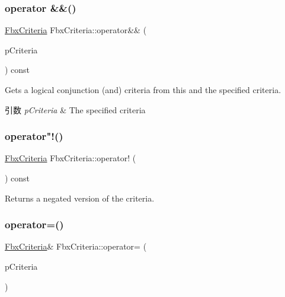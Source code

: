 \subsubsection{\texorpdfstring{operator \&\&()}{operator \&\&()}}
{\footnotesize\ttfamily \hyperlink{class_fbx_criteria}{Fbx\+Criteria} Fbx\+Criteria\+::operator\&\& (\begin{DoxyParamCaption}\item[{const \hyperlink{class_fbx_criteria}{Fbx\+Criteria} \&}]{p\+Criteria }\end{DoxyParamCaption}) const}

Gets a logical conjunction (and) criteria from this and the specified criteria. 
\begin{DoxyParams}{引数}
{\em p\+Criteria} & The specified criteria \\
\hline
\end{DoxyParams}
\mbox{\label{class_fbx_criteria_ad2da0815273fdbcca514b80d77cb58bd}} 
\subsubsection{\texorpdfstring{operator"!()}{operator!()}}
{\footnotesize\ttfamily \hyperlink{class_fbx_criteria}{Fbx\+Criteria} Fbx\+Criteria\+::operator! (\begin{DoxyParamCaption}{ }\end{DoxyParamCaption}) const}



Returns a negated version of the criteria. 

\mbox{\label{class_fbx_criteria_a9ffc10bdc0222d4fde6e902890dca8b2}} 
\subsubsection{\texorpdfstring{operator=()}{operator=()}}
{\footnotesize\ttfamily \hyperlink{class_fbx_criteria}{Fbx\+Criteria}\& Fbx\+Criteria\+::operator= (\begin{DoxyParamCaption}\item[{const \hyperlink{class_fbx_criteria}{Fbx\+Criteria} \&}]{p\+Criteria }\end{DoxyParamCaption})}

